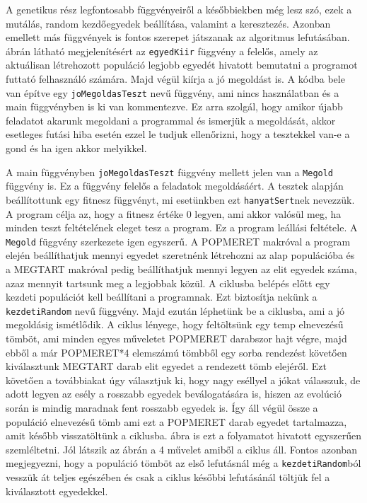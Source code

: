 \documentclass[12ppt,a4paper,oneside]{report}
\begin{document}
			{A genetikus rész legfontosabb függvényeiről a későbbiekben még lesz szó, ezek a mutálás, random kezdőegyedek beállítása, valamint a keresztezés. Azonban emellett más függvények is fontos szerepet játszanak az algoritmus lefutásában.  ábrán látható megjelenítésért az \texttt{egyedKiir} függvény a felelős, amely az aktuálisan létrehozott populáció legjobb egyedét hivatott bemutatni a programot futtató felhasználó számára. Majd végül kiírja a jó megoldást is. A kódba bele van építve egy \texttt{joMegoldasTeszt} nevű függvény, ami nincs használatban és a main függvényben is ki van kommentezve. Ez arra szolgál, hogy amikor újabb feladatot akarunk megoldani a programmal és ismerjük a megoldását, akkor esetleges futási hiba esetén ezzel le tudjuk ellenőrizni, hogy a tesztekkel van-e a gond és ha igen akkor melyikkel.}
			
			
			{A main függvényben \texttt{joMegoldasTeszt} függvény mellett jelen van a \texttt{Megold} függvény is. Ez a függvény felelős a feladatok megoldásáért. A tesztek alapján beállítottunk egy fitnesz függvényt, mi esetünkben ezt \texttt{hanyatSert}nek nevezzük. A program célja az, hogy a fitnesz értéke 0 legyen, ami akkor valósül meg, ha minden teszt feltételének eleget tesz a program. Ez a program leállási feltétele. A \texttt{Megold} függvény szerkezete igen egyszerű. A POPMERET makróval a program elején beállíthatjuk mennyi egyedet szeretnénk létrehozni az alap populációba és a MEGTART makróval pedig beállíthatjuk mennyi legyen az elit egyedek száma, azaz mennyit tartsunk meg a legjobbak közül. A ciklusba belépés előtt egy kezdeti populációt kell beállítani a programnak. Ezt biztosítja nekünk a \texttt{kezdetiRandom} nevű függvény. Majd ezután léphetünk be a ciklusba, ami a jó megoldásig ismétlődik. A ciklus lényege, hogy feltöltsünk egy temp elnevezésű tömböt, ami minden egyes műveletet POPMERET darabszor hajt végre, majd ebből a már POPMERET*4 elemszámú tömbből egy sorba rendezést követően kiválasztunk MEGTART darab elit egyedet a rendezett tömb elejéről. Ezt követően a továbbiakat úgy választjuk ki, hogy nagy eséllyel a jókat válasszuk, de adott legyen az esély a rosszabb egyedek beválogatására is, hiszen az evolúció során is mindig maradnak fent rosszabb egyedek is. Így áll végül össze a populáció elnevezésű tömb ami ezt a POPMERET darab egyedet tartalmazza, amit később visszatöltünk a ciklusba.  ábra is ezt a folyamatot hivatott egyszerűen szemléltetni. Jól látszik az ábrán a 4 művelet amiből a ciklus áll. Fontos azonban megjegyezni, hogy a populáció tömböt az első lefutásnál még a \texttt{kezdetiRandom}ból vesszük át teljes egészében és csak a ciklus későbbi lefutásánál töltjük fel a kiválasztott egyedekkel.}
			
\end{document}
